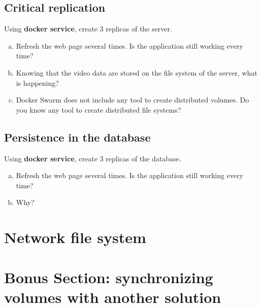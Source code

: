 \documentclass[a4paper,11pt]{exam}
\begin{document}
\subsection{Critical replication}
\begin{questions}
	\question Using \textbf{docker service}, create 3 replicas of the server.
	\begin{enumerate}[(a)]
		\item Refresh the web page several times. Is the application still working every time?
		\item Knowing that the video data are stored on the file system of the server, what is happening?
		\item Docker Swarm does not include any tool to create distributed volumes. Do you know any tool to create distributed file systems?
	\end{enumerate}
\end{questions}

\subsection{Persistence in the database}
\begin{questions}
	\question Using \textbf{docker service}, create 3 replicas of the database.
	\begin{enumerate}[(a)]
		\item Refresh the web page several times. Is the application still working every time?
		\item Why?
	\end{enumerate}
\end{questions}

\section{Network file system}



\section{Bonus Section: synchronizing volumes with another solution}
\end{document}
